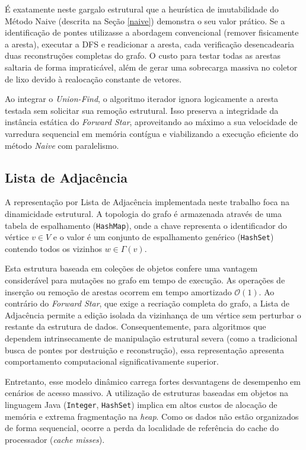 \documentclass[12pt]{article}
\begin{document}
É exatamente neste gargalo estrutural que a heurística de imutabilidade do Método Naive (descrita na Seção \ref{naive}) demonstra o seu valor prático. Se a identificação de pontes utilizasse a abordagem convencional (remover fisicamente a aresta), executar a DFS e readicionar a aresta, cada verificação desencadearia duas reconstruções completas do grafo. O custo para testar todas as arestas saltaria de forma impraticável, além de gerar uma sobrecarga massiva no coletor de lixo devido à realocação constante de vetores.

Ao integrar o \textit{Union-Find}, o algoritmo iterador ignora logicamente a aresta testada sem solicitar sua remoção estrutural. Isso preserva a integridade da instância estática do \textit{Forward Star}, aproveitando ao máximo a sua velocidade de varredura sequencial em memória contígua e viabilizando a execução eficiente do método \textit{Naive} com paralelismo.

\subsection{Lista de Adjacência} \label{adj-list}

A representação por Lista de Adjacência implementada neste trabalho foca na dinamicidade estrutural. A topologia do grafo é armazenada através de uma tabela de espalhamento (\texttt{HashMap}), onde a chave representa o identificador do vértice $v \in V$ e o valor é um conjunto de espalhamento genérico (\texttt{HashSet}) contendo todos os vizinhos $w \in \Gamma(v)$. 

Esta estrutura baseada em coleções de objetos confere uma vantagem considerável para mutações no grafo em tempo de execução. As operações de inserção ou remoção de arestas ocorrem em tempo amortizado $\mathcal{O}(1)$. Ao contrário do \textit{Forward Star}, que exige a recriação completa do grafo, a Lista de Adjacência permite a edição isolada da vizinhança de um vértice sem perturbar o restante da estrutura de dados. Consequentemente, para algoritmos que dependem intrinsecamente de manipulação estrutural severa (como a tradicional busca de pontes por destruição e reconstrução), essa representação apresenta comportamento computacional significativamente superior.

Entretanto, esse modelo dinâmico carrega fortes desvantagens de desempenho em cenários de acesso massivo. A utilização de estruturas baseadas em objetos na linguagem Java (\texttt{Integer}, \texttt{HashSet}) implica em altos custos de alocação de memória e extrema fragmentação na \textit{heap}. Como os dados não estão organizados de forma sequencial, ocorre a perda da localidade de referência do cache do processador (\textit{cache misses}).
\end{document}
